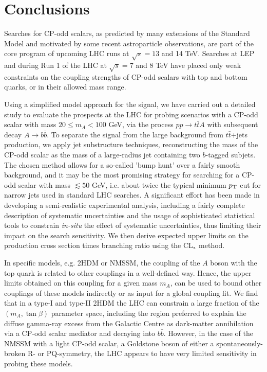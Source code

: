 \documentclass[preprintnumbers,superscriptaddress,nofootinbib,aps,prd,floatfix]{revtex4}
\newcommand{\pt}{p_{\rm{T}}}
\begin{document}

\section{Conclusions}
\label{sec:conclusion}

Searches for CP-odd scalars, as predicted by many extensions of the Standard Model and motivated by some recent astroparticle observations, are part of the core program of upcoming LHC runs at $\sqrt{s}=13$ and 14 TeV. Searches at LEP and during Run 1 of the LHC at $\sqrt{s}=7$ and 8 TeV have placed only weak constraints on the coupling strengths of CP-odd scalars with top and bottom quarks, or in their allowed mass range.

Using a simplified model approach for the signal, we have carried out a detailed study to evaluate the prospects at the LHC for probing scenarios with a 
CP-odd scalar with mass $20 \leq m_A < 100$ GeV, via the process $pp \to t\bar{t}A$ with subsequent decay $A\to b\bar{b}$. To separate the signal from the large background from $t\bar{t}$+jets production, we apply jet substructure techniques, reconstructing the mass of the CP-odd scalar as the mass of a 
large-radius jet containing two $b$-tagged subjets. 
The chosen method allows for a so-called 'bump hunt' over a fairly smooth background, and it may be the most promising strategy for searching for a CP-odd scalar with mass $\lesssim 50$ GeV, i.e. about twice the typical minimum $\pt$ cut for narrow jets used in standard LHC searches. A significant effort has been made in developing a semi-realistic experimental analysis, including a fairly complete description of systematic uncertainties and the usage of sophisticated statistical tools to constrain  {\em in-situ} the effect of systematic uncertainties, thus limiting their impact on the search sensitivity. We then derive expected upper limits on the production cross section times branching ratio using the CL$_{\rm{s}}$ method.

In specific models, e.g. 2HDM or NMSSM, the coupling of the $A$ boson with the top quark is related to other couplings in a well-defined way. Hence, the upper 
limits obtained on this coupling for a given mass $m_A$, can be used to bound other couplings of these models indirectly or as input for 
a global coupling fit. We find that in a type-I and type-II 2HDM the LHC can constrain a large fraction of the $(m_A, \tan \beta)$ parameter space, including 
the region preferred to explain the diffuse gamma-ray excess from the Galactic Centre as dark-matter annihilation via a CP-odd scalar mediator and decaying
into $b\bar{b}$. 
However, in the case of the NMSSM with a light CP-odd scalar, a Goldstone boson of either a spontaneously-broken R- or PQ-symmetry, 
the LHC appears to have very limited sensitivity in probing these models. 
\end{document}
